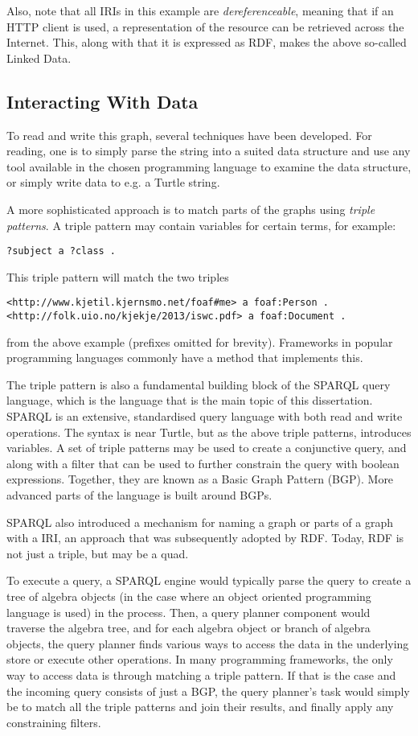 Also, note that all IRIs in this example are \emph{dereferenceable},
meaning that if an HTTP client is used, a representation of the
resource can be retrieved across the Internet. This, along with that
it is expressed as RDF, makes the above so-called Linked Data.

\subsection{Interacting With Data}

To read and write this graph, several techniques have been
developed. For reading, one is to simply parse the string into a
suited data structure and use any tool available in the chosen
programming language to examine the data structure, or simply write
data to e.g. a Turtle string.

A more sophisticated approach is to match parts of the graphs using
\emph{triple patterns}. A triple pattern may contain variables for
certain terms, for example:

\begin{verbatim}
?subject a ?class .
\end{verbatim}
This triple pattern will match the two triples 
\begin{verbatim}
<http://www.kjetil.kjernsmo.net/foaf#me> a foaf:Person .
<http://folk.uio.no/kjekje/2013/iswc.pdf> a foaf:Document .
\end{verbatim}
from the above example (prefixes omitted for brevity). Frameworks in
popular programming languages commonly have a method that implements
this.

The triple pattern is also a fundamental building block of the SPARQL
query language, which is the language that is the main topic of this
dissertation. SPARQL is an extensive, standardised query language with
both read and write operations. The syntax is near Turtle, but as the
above triple patterns, introduces variables. A set of triple patterns
may be used to create a conjunctive query, and along with a filter
that can be used to further constrain the query with boolean
expressions. Together, they are known as a Basic Graph Pattern
(BGP). More advanced parts of the language is built around BGPs.

SPARQL also introduced a mechanism for naming a graph or parts of a
graph with a IRI, an approach that was subsequently adopted by
RDF. Today, RDF is not just a triple, but may be a quad.

To execute a query, a SPARQL engine would typically parse the query to
create a tree of algebra objects (in the case where an object oriented
programming language is used) in the process. Then, a query planner
component would traverse the algebra tree, and for each algebra object
or branch of algebra objects, the query planner finds various ways to
access the data in the underlying store or execute other
operations. In many programming frameworks, the only way to access
data is through matching a triple pattern. If that is the case and
the incoming query consists of just a BGP, the query planner's task
would simply be to match all the triple patterns and join their
results, and finally apply any constraining filters. 

